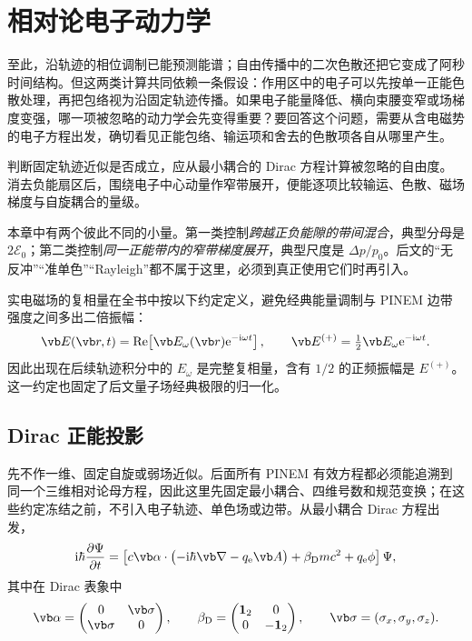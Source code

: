 \chapter{相对论电子动力学}
\label{chap:electron-reduction}

至此，沿轨迹的相位调制已能预测能谱；自由传播中的二次色散还把它变成了阿秒时间结构。但这两类计算共同依赖一条假设：作用区中的电子可以先按单一正能色散处理，再把包络视为沿固定轨迹传播。如果电子能量降低、横向束腰变窄或场梯度变强，哪一项被忽略的动力学会先变得重要？要回答这个问题，需要从含电磁势的电子方程出发，确切看见正能包络、输运项和舍去的色散项各自从哪里产生。


判断固定轨迹近似是否成立，应从最小耦合的 Dirac 方程计算被忽略的自由度。消去负能扇区后，围绕电子中心动量作窄带展开，便能逐项比较输运、色散、磁场梯度与自旋耦合的量级。

本章中有两个彼此不同的小量。第一类控制\emph{跨越正负能隙的带间混合}，典型分母是 $2\mathcal E_0$；第二类控制\emph{同一正能带内的窄带梯度展开}，典型尺度是 $\Delta p/p_0$。后文的“无反冲”“准单色”“Rayleigh”都不属于这里，必须到真正使用它们时再引入。

实电磁场的复相量在全书中按以下约定定义，避免经典能量调制与 PINEM 边带强度之间多出二倍振幅：
\begin{equation}
\vb E(\vb r,t)=\operatorname{Re}\!\left[\vb E_\omega(\vb r)\ee^{-\ii\omega t}\right],\qquad
\vb E^{(+)}=\tfrac12\vb E_\omega\ee^{-\ii\omega t}.
\label{eq:phasor-convention}
\end{equation}
因此出现在后续轨迹积分中的 $E_\omega$ 是完整复相量，含有 $1/2$ 的正频振幅是 $E^{(+)}$。这一约定也固定了后文量子场经典极限的归一化。


\section{Dirac 正能投影}
先不作一维、固定自旋或弱场近似。后面所有 PINEM 有效方程都必须能追溯到同一个三维相对论母方程，因此这里先固定最小耦合、四维号数和规范变换；在这些约定冻结之前，不引入电子轨迹、单色场或边带。从最小耦合 Dirac 方程出发，
\begin{equation}
 \ii\hbar\frac{\partial\Psi}{\partial t}
 =\left[c\vb\alpha\cdot\bigl(-\ii\hbar\vb\nabla-q_{\rm e}\vb A\bigr)
 +\beta_{\rm D}mc^2+q_{\rm e}\phi\right]\Psi,
 \label{eq:dirac-3d}
\end{equation}
其中在 Dirac 表象中
\begin{equation}
 \vb\alpha=
 \begin{pmatrix}
 0&\vb\sigma\\
 \vb\sigma&0
 \end{pmatrix},
 \qquad
 \beta_{\rm D}=
 \begin{pmatrix}
 \mathbf 1_2&0\\
 0&-\mathbf 1_2
 \end{pmatrix},
 \qquad
 \vb\sigma=(\sigma_x,\sigma_y,\sigma_z).
 \label{eq:dirac-matrices}
\end{equation}


